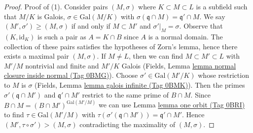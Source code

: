 \documentclass{amsart}
\theoremstyle{plain}
\theoremstyle{definition}
\theoremstyle{remark}
\numberwithin{equation}{subsection}
\begin{document}
\begin{proof}
Proof of (1). Consider pairs $(M, \sigma)$ where $K \subset M \subset L$
is a subfield such that $M/K$ is Galois, $\sigma \in \text{Gal}(M/K)$
with $\sigma(\mathfrak q \cap M) = \mathfrak q' \cap M$.
We say $(M', \sigma') \geq (M, \sigma)$ if and only if
$M \subset M'$ and $\sigma'|_M = \sigma$.
Observe that $(K, \text{id}_K)$ is such a pair as $A = K \cap B$
since $A$ is a normal domain.
The collection of these pairs satisfies the hypotheses of Zorn's lemma,
hence there exists a maximal pair $(M, \sigma)$.
If $M \not = L$, then we can find
$M \subset M' \subset L$ with $M'/M$ nontrivial and finite and $M'/K$ Galois
(Fields, Lemma \href{https://stacks.math.columbia.edu/tag/0BMG}{lemma normal closure inside normal (Tag 0BMG)}).
Choose $\sigma' \in \text{Gal}(M'/K)$ whose restriction to $M$
is $\sigma$ (Fields, Lemma \href{https://stacks.math.columbia.edu/tag/0BMK}{lemma galois infinite (Tag 0BMK)}).
Then the primes $\sigma'(\mathfrak q \cap M')$ and $\mathfrak q' \cap M'$
restrict to the same prime of $B \cap M$. Since
$B \cap M = (B \cap M')^{\text{Gal}(M'/M)}$ we can
use Lemma \href{https://stacks.math.columbia.edu/tag/0BRI}{lemma one orbit (Tag 0BRI)} to find $\tau \in \text{Gal}(M'/M)$
with $\tau(\sigma'(\mathfrak q \cap M')) = \mathfrak q' \cap M'$.
Hence $(M', \tau \circ \sigma') > (M, \sigma)$
contradicting the maximality of $(M, \sigma)$.


\end{proof}
\end{document}
